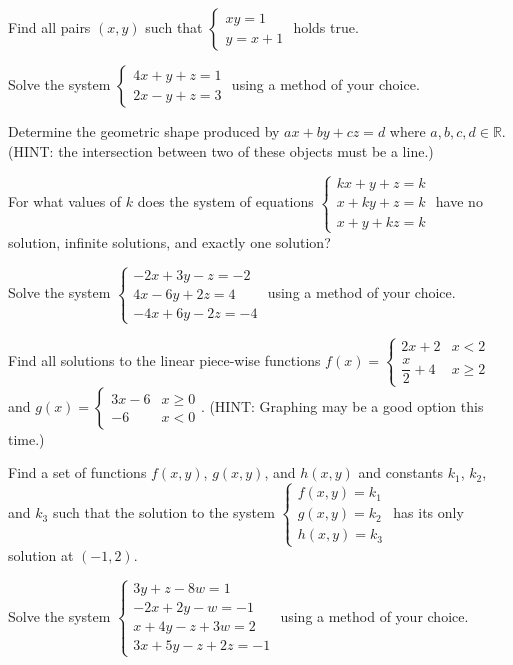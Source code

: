 \documentclass[../book.tex]{subfiles}
\begin{document}
\begin{reviewset}
\item Find all pairs $(x,y)$ such that $\begin{cases} xy=1 \\ y=x+1\end{cases}$ holds true.
\end{reviewset}
\begin{challengeset}
\item Solve the system $\begin{cases} 4x+y+z=1 \\ 2x-y+z=3 \end{cases}$ using a method of your choice.
\item Determine the geometric shape produced by $ax+by+cz=d$ where $a,b,c,d\in\mathbb{R}$.  (HINT: the intersection between two of these objects must be a line.)
\item For what values of $k$ does the system of equations $\begin{cases} kx+y+z=k \\ x+ky+z=k \\ x+y+kz=k \end{cases}$ have no solution, infinite solutions, and exactly one solution?
\item Solve the system $\begin{cases} -2x+3y-z=-2 \\ 4x-6y+2z=4 \\ -4x+6y-2z=-4\end{cases}$ using a method of your choice.
\item Find all solutions to the linear piece-wise functions $f(x)=\begin{cases} 2x+2 & x<2 \\ \dfrac{x}{2}+4 & x\geq 2 \end{cases}$ and $g(x)=\begin{cases} 3x-6 & x\geq 0 \\ -6 & x<0\end{cases}$.  (HINT: Graphing may be a good option this time.)
\item Find a set of functions $f(x,y)$, $g(x,y)$, and $h(x,y)$ and constants $k_1$, $k_2$, and $k_3$ such that the solution to the system $\begin{cases} f(x,y)=k_1 \\ g(x,y)=k_2 \\ h(x,y)=k_3 \end{cases}$ has its only solution at $(-1,2)$.
\item Solve the system $\begin{cases} 3y+z-8w=1 \\ -2x+2y-w=-1 \\ x+4y-z+3w=2 \\ 3x+5y-z+2z=-1 \end{cases}$ using a method of your choice.

\end{challengeset}
\end{document}
